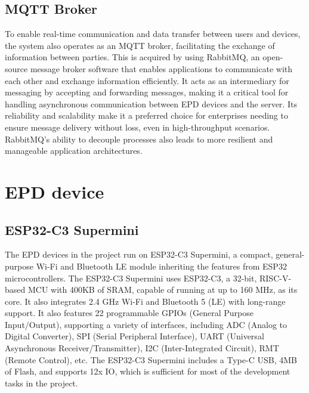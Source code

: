 \documentclass[../Main.tex]{subfiles}
\begin{document}
\subsection{MQTT Broker}
To enable real-time communication and data transfer between users and devices, the system also operates as an MQTT broker, facilitating the exchange of information between parties. This is acquired by using RabbitMQ, an open-source message broker software that enables applications to communicate with each other and exchange information efficiently. It acts as an intermediary for messaging by accepting and forwarding messages, making it a critical tool for handling asynchronous communication between \gls{EPD} devices and the server. Its reliability and scalability make it a preferred choice for enterprises needing to ensure message delivery without loss, even in high-throughput scenarios. RabbitMQ's ability to decouple processes also leads to more resilient and manageable application architectures.

\section{EPD device}
\subsection{ESP32-C3 Supermini}
The \gls{EPD} devices in the project run on ESP32-C3 Supermini, a compact, general-purpose Wi-Fi and Bluetooth LE module inheriting the features from ESP32 microcontrollers. The ESP32-C3 Supermini uses ESP32-C3, a 32-bit, RISC-V-based MCU with 400KB of SRAM, capable of running at up to 160 MHz, as its core. It also integrates 2.4 GHz Wi-Fi and Bluetooth 5 (LE) with long-range support. It also features 22 programmable GPIOs (General Purpose Input/Output), supporting a variety of interfaces, including ADC (Analog to Digital Converter), SPI (Serial Peripheral Interface), UART (Universal Asynchronous Receiver/Transmitter), I2C (Inter-Integrated Circuit), RMT (Remote Control), etc. The ESP32-C3 Supermini includes a Type-C USB, 4MB of Flash, and supports 12x IO, which is sufficient for most of the development tasks in the project.
\end{document}
